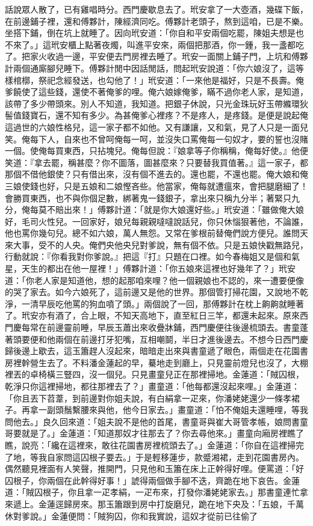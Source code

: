 \begin{showcontents}{}
話說眾人散了，已有雞唱時分。西門慶歇息去了。玳安拿了一大壺酒，幾碟下飯，在前邊鋪子裡，還和傅夥計，陳經濟同吃。傅夥計老頭子，熬到這咱，已是不樂。坐搭下鋪，倒在坑上就睡了。因向玳安道：「你自和平安兩個吃罷，陳姐夫想是也不來了。」這玳安櫃上點著夜燭，叫進平安來，兩個把那酒，你一鍾，我一盞都吃了。把家火收過一邊，平安便去門房裡去睡了。玳安一面關上鋪子門，上坑和傅夥計兩個通廝腳兒睡下。傅夥計閒中因話閒話，問起玳安說道：「你六娘沒了，這等樣棺槨，祭祀念經發送，也勾他了！」玳安道：「一來他是福好，只是不長壽。俺爹饒使了這些錢，還使不著俺爹的哩。俺六娘嫁俺爹，瞞不過你老人家，是知道，該帶了多少帶頭來。別人不知道，我知道。把銀子休說，只光金珠玩好玉帶縧環狄髻值錢寶石，還不知有多少。為甚俺爹心裡疼？不是疼人，是疼錢。是便是說起俺這過世的六娘性格兒，這一家子都不如他。又有謙讓，又和氣，見了人只是一面兒笑。俺每下人，自來也不曾呵俺每一呵，並沒失口罵俺每一句奴才，要的誓也沒賭一個。使俺每買東西，只拈塊兒。俺每但說：『娘拿等子你稱稱，俺每好使。』他便笑道：『拿去罷，稱甚麼？你不圖落，圖甚麼來？只要替我買值著。』這一家子，都那個不借他銀使？只有借出來，沒有個不進去的。還也罷，不還也罷。俺大娘和俺三娘使錢也好，只是五娘和二娘慳吝些。他當家，俺每就遭瘟來，會把腿磨細了！會勝買東西，也不與你個足數，綁著鬼一錢銀子，拿出來只稱九分半；著緊只九分，俺每莫不賠出來！」傅夥計道：「就是你大娘還好些。」玳安道：「雖做俺大娘好，毛司火性兒。一回家好，娘兒每親親噠噠說話兒，你只休惱狠著他，不論誰，他也罵你幾句兒。總不如六娘，萬人無怨。又常在爹根前替俺們說方便兒。誰問天來大事，受不的人央。俺們央他央兒對爹說，無有個不依。只是五娘快戳無路兒，行動就說：『你看我對你爹說。』把這『打』只題在口裡。如今春梅姐又是個和氣星，天生的都出在他一屋裡！」傅夥計道：「你五娘來這裡也好幾年了？」玳安道：「你老人家是知道他，想的起那咱來哩？他一個親娘也不認的，來一遭要便像的哭了家去。如今六娘死了，這前邊又是他的世界。那個管打掃花園，又說地不乾淨，一清早辰吃他罵的狗血噴了頭。」兩個說了一回，那傅夥計在枕上齁齁就睡著了。玳安亦有酒了，合上眼，不知天高地下，直至紅日三竿，都還未起來。原來西門慶每常在前邊靈前睡，早辰玉蕭出來收疊牀鋪，西門慶便往後邊梳頭去。書童蓬著頭要便和他兩個在前邊打牙犯嘴，互相嘲鬬，半日才進後邊去。不想今日西門慶歸後邊上歇去，這玉簫趕人沒起來，暗暗走出來與書童遞了眼色，兩個走在花園書房裡幹營生去了。不料潘金蓮起的早，驀地走到廳上，只見靈前燈兒也沒了，大棚裡丟的卓椅橫三豎四，沒一個兒。只見畫童兒正在那裡掃地。金蓮道：「賊囚根，乾淨只你這裡掃地，都往那裡去了？」畫童道：「他每都還沒起來哩。」金蓮道：「你且丟下苕葦，到前邊對你姐夫說，有白絹拿一疋來，你潘姥姥還少一條孝裙子。再拿一副頭鬚繫腰來與他，他今日家去。」畫童道：「怕不俺姐夫還睡哩，等我問他去。」良久回來道：「姐夫說不是他的首尾，書童哥與崔大哥管孝帳，娘問書童哥要就是了。」金蓮道：「知道那奴才往那去了？你去尋他來。」畫童向廂房裡瞧了瞧，說亮：「纔在這裡來，敢往花園書房裡梳頭去了。」金蓮道：「你自在這裡掃完了地，等我自家問這囚根子要去。」于是輕移蓮步，款蹙湘裙，走到花園書房內。偶然聽見裡面有人笑聲，推開門，只見他和玉簫在床上正幹得好哩。便罵道：「好囚根子，你兩個在此幹得好事！」諕得兩個做手腳不迭，齊跪在地下哀告。金蓮道：「賊囚根子，你且拿一疋孝絹，一疋布來，打發你潘姥姥家去。」那書童連忙拿來遞上。金蓮逕歸房來。那玉簫跟到房中打旋磨兒，跪在地下央及：「五娘，千萬休對爹說。」金蓮便問：「賊狗囚，你和我實說，這奴才從前已往偷了
\end{showcontents}
